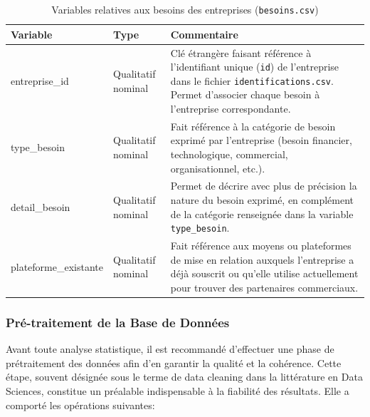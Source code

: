 \documentclass[12pt, a4paper, oneside]{report}
\begin{document}
	\begin{table}[H]
		\centering
		\caption{Variables relatives aux besoins des entreprises
			(\texttt{besoins.csv})}
		\label{tab:var_besoins}
		\renewcommand{\arraystretch}{1.5}
		\begin{tabularx}{\textwidth}{
				>{\ttfamily\raggedright\arraybackslash}p{3.8cm}
				>{\raggedright\arraybackslash}p{2.8cm}
				>{\raggedright\arraybackslash}X}
			
			\toprule
			\rowcolor{primary!15}
			\textbf{Variable} & \textbf{Type} & \textbf{Commentaire} \\
			\midrule
			
			entreprise\_id
			& Qualitatif nominal
			& Clé étrangère faisant référence à l'identifiant unique
			(\texttt{id}) de l'entreprise dans le fichier
			\texttt{identifications.csv}. Permet d'associer chaque
			besoin à l'entreprise correspondante. \\
			
			\rowcolor{lightgray}
			type\_besoin
			& Qualitatif nominal
			& Fait référence à la catégorie de besoin exprimé par
			l'entreprise (besoin financier, technologique,
			commercial, organisationnel, etc.). \\
			
			detail\_besoin
			& Qualitatif nominal
			& Permet de décrire avec plus de précision la nature
			du besoin exprimé, en complément de la catégorie
			renseignée dans la variable \texttt{type\_besoin}. \\
			
			\rowcolor{lightgray}
			plateforme\_existante
			& Qualitatif nominal
			& Fait référence aux moyens ou plateformes de mise en
			relation auxquels l'entreprise a déjà souscrit ou
			qu'elle utilise actuellement pour trouver des
			partenaires commerciaux. \\
			
			\bottomrule
		\end{tabularx}
	\end{table}
	\subsubsection{Pré-traitement de la Base de Données}
	
	Avant toute analyse statistique, il est recommandé d'effectuer une phase de prétraitement des données afin d'en garantir la qualité et la cohérence. Cette étape, souvent désignée sous le terme de data cleaning dans la littérature en Data Sciences, constitue un préalable indispensable à la fiabilité des résultats. Elle a comporté les opérations suivantes:
	
\end{document}
